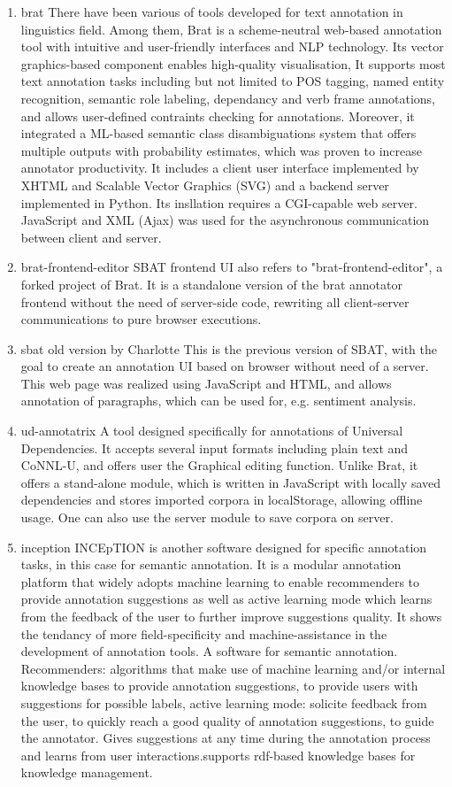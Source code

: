 \documentclass[a4paper]{article}
\begin{document}
\begin{enumerate}
\item brat
There have been various of tools developed for text annotation in linguistics field. Among them, Brat is a scheme-neutral web-based annotation tool with intuitive and user-friendly interfaces and NLP technology. Its vector graphics-based component enables high-quality visualisation, It supports most text annotation tasks including but not limited to POS tagging, named entity recognition, semantic role labeling, dependancy and verb frame annotations, and allows user-defined contraints checking for annotations. Moreover, it integrated a ML-based semantic class disambiguations system that offers multiple outputs with probability estimates, which was proven to increase annotator productivity. It includes a client user interface implemented by XHTML and Scalable Vector Graphics (SVG) and a backend server implemented in Python. Its insllation requires a CGI-capable web server. JavaScript and XML (Ajax) was used for the asynchronous communication between client and server.
\item brat-frontend-editor
SBAT frontend UI also refers to "brat-frontend-editor", a forked project of Brat. It is a standalone version of the brat annotator frontend without the need of server-side code, rewriting all client-server communications to pure browser executions.
\item sbat old version by Charlotte
This is the previous version of SBAT, with the goal to create an annotation UI based on browser without need of a server. This web page was realized using JavaScript and HTML, and allows annotation of paragraphs, which can be used for, e.g. sentiment analysis.
\item ud-annotatrix
A tool designed specifically for annotations of Universal Dependencies. It accepts several input formats including plain text and CoNNL-U, and offers user the Graphical editing function. Unlike Brat, it offers a stand-alone module, which is written in JavaScript with locally saved dependencies and stores imported corpora in localStorage, allowing offline usage. One can also use the server module to save corpora on server.
\item inception
INCEpTION is another software designed for specific annotation tasks, in this case for semantic annotation. It is a modular annotation platform that widely adopts machine learning to enable recommenders to provide annotation suggestions as well as active learning mode which learns from the feedback of the user to further improve suggestions quality. It shows the tendancy of more field-specificity and machine-assistance in the development of annotation tools.
A software for semantic annotation. Recommenders: algorithms that make use of machine learning and/or internal knowledge bases to provide annotation suggestions, to provide users with suggestions for possible labels, active learning mode: solicite feedback from the user, to quickly reach a good quality of annotation suggestions, to guide the annotator. Gives suggestions at any time during the annotation process and learns from user interactions.supports rdf-based knowledge bases for knowledge management.
\end{enumerate}
\end{document}
